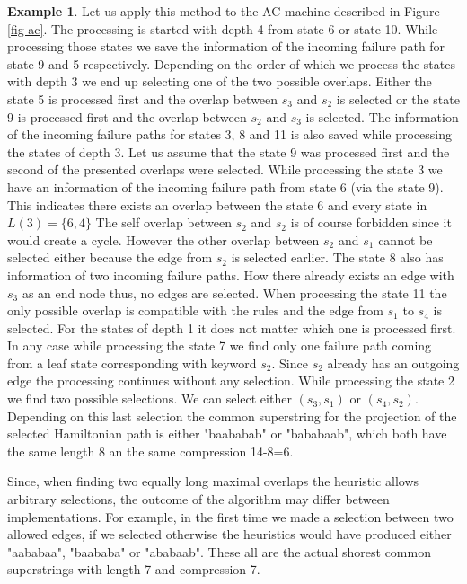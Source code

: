 \documentclass[english,twoside,censored,csm,algorithms-track-2020]{HYthesisML}
\theoremstyle{plain}
\theoremstyle{definition}
\newtheorem{example}[theorem]{Example}
\begin{document}
\begin{example}
Let us apply this method to the AC-machine described in Figure \ref{fig-ac}. The processing is started
with depth 4 from state 6 or state 10. While processing those states we save the information of
the incoming failure path for state 9 and 5 respectively. Depending on the order of which we process
the states with depth 3 we end up selecting one of the two possible overlaps. Either the state 5
is processed first and the overlap between $s_3$ and $s_2$ is selected or the state 9 is processed
first and the overlap between $s_2$ and $s_3$ is selected. The information of the incoming failure
paths for states 3, 8 and 11 is also saved while processing the states of depth 3. Let us assume
that the state 9 was processed first and the second of the presented overlaps were selected.
While processing the state 3 we have an information of the incoming failure path from state 6 (via the
state 9). This indicates there exists an overlap between the state 6 and every state
in $L(3)=\{6,4\}$ The self overlap between $s_2$ and $s_2$ is of course forbidden since it would
create a cycle. However the other overlap between $s_2$ and $s_1$ cannot be selected either because
the edge from $s_2$ is selected earlier. The state 8 also has information of two incoming failure
paths. How there already exists an edge with $s_3$ as an end node thus, no edges are selected.
When processing the state 11 the only possible overlap is compatible with the rules and the edge
from $s_1$ to $s_4$ is selected. For the states of depth 1 it does not matter which one is processed
first. In any case while processing the state 7 we find only one failure path coming from a leaf state
corresponding with keyword $s_2$. Since $s_2$ already has an outgoing edge the processing continues
without any selection. While processing the state 2 we find two possible selections. We can select
either $(s_3,s_1)$ or $(s_4,s_2)$. Depending on this last selection the common superstring for
the projection of the selected Hamiltonian path is either "baababab" or "bababaab", which
both have the same length 8 an the same compression 14-8=6.

Since, when finding two equally long maximal overlaps the heuristic allows arbitrary selections,
the outcome of the algorithm may differ between implementations. For example, in the first time
we made a selection between two allowed edges, if we selected otherwise the heuristics would
have produced either "aababaa", "baababa" or "ababaab". These all are the actual shorest common
superstrings with length 7 and compression 7.
\end{example}
\end{document}
